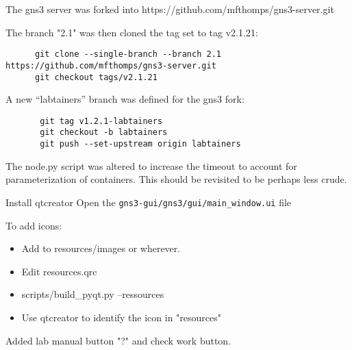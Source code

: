 \documentclass[12pt]{article}
\begin{document}
The gns3 server was forked into https://github.com/mfthomps/gns3-server.git

The branch "2.1" was then cloned the tag set to tag v2.1.21:
\small
\begin{verbatim}
      git clone --single-branch --branch 2.1 https://github.com/mfthomps/gns3-server.git
      git checkout tags/v2.1.21
\end{verbatim}

\normalsize
\noindent A new ``labtainers'' branch was defined for the gns3 fork:
\begin{verbatim}
       git tag v1.2.1-labtainers
       git checkout -b labtainers
       git push --set-upstream origin labtainers
\end{verbatim}

The node.py script was altered to increase the timeout to account for parameterization of
containers.  This should be revisited to be perhaps less crude.

\bigskip
Install qtcreator
Open the {\tt gns3-gui/gns3/gui/main\_window.ui} file

To add icons:
\begin{itemize}
\item Add to resources/images or wherever.
\item Edit resources.qrc
\item scripts/build\_pyqt.py --ressources
\item Use qtcreator to identify the icon in "resources"
\end{itemize}
Added lab manual button "?" and check work button.
\end{document}
